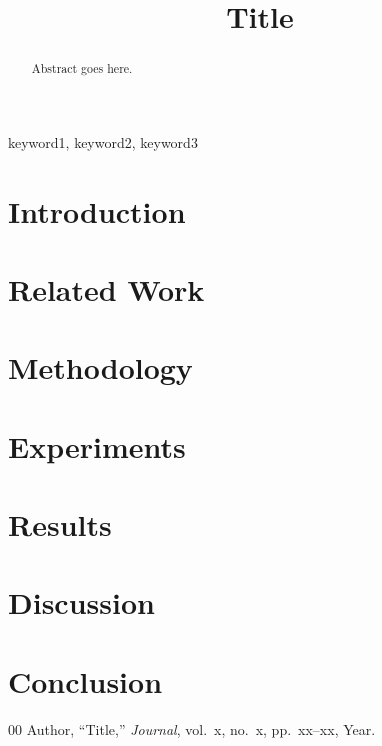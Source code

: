 \documentclass[conference]{IEEEtran}
\begin{document}
\title{Title}

\author{
\and
{}
}

\maketitle

\begin{abstract}
Abstract goes here.
\end{abstract}

\begin{IEEEkeywords}
keyword1, keyword2, keyword3
\end{IEEEkeywords}

\section{Introduction}

\section{Related Work}

\section{Methodology}

\section{Experiments}

\section{Results}

\section{Discussion}

\section{Conclusion}

\begin{thebibliography}{00}
 Author, ``Title,'' \emph{Journal}, vol.~x, no.~x, pp.~xx--xx, Year.
\end{thebibliography}
\end{document}
